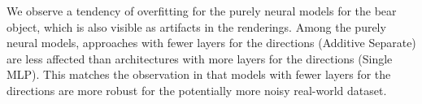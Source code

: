 \begin{figure*}[t]
{  We observe a tendency of overfitting for the purely neural models for the bear object, which is also visible as artifacts in the renderings. Among the purely neural models, approaches with fewer layers for the directions (\eg Additive Separate) are less affected than architectures with more layers for the directions (\eg Single MLP). This matches the observation in
  \iftoggle{arxiv}{\cref{sec:analysis_brdf_models}}{Sec.~6.2}
  that models with fewer layers for the directions are more robust for the potentially more noisy real-world dataset.
  }
\label{fig:supp:renderings_real}
\end{figure*}
